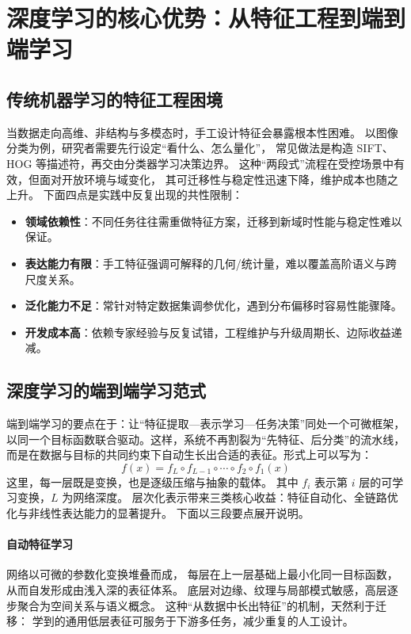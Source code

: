 \section{深度学习的核心优势：从特征工程到端到端学习}

\subsection{传统机器学习的特征工程困境}

当数据走向高维、非结构与多模态时，手工设计特征会暴露根本性困难。  
以图像分类为例，研究者需要先行设定“看什么、怎么量化”，  
常见做法是构造 SIFT、HOG 等描述符，再交由分类器学习决策边界。  
这种“两段式”流程在受控场景中有效，但面对开放环境与域变化，  
其可迁移性与稳定性迅速下降，维护成本也随之上升。  
下面四点是实践中反复出现的共性限制：

\begin{itemize}
\item {\bf 领域依赖性}：不同任务往往需重做特征方案，迁移到新域时性能与稳定性难以保证。
\item {\bf 表达能力有限}：手工特征强调可解释的几何/统计量，难以覆盖高阶语义与跨尺度关系。
\item {\bf 泛化能力不足}：常针对特定数据集调参优化，遇到分布偏移时容易性能骤降。
\item {\bf 开发成本高}：依赖专家经验与反复试错，工程维护与升级周期长、边际收益递减。
\end{itemize}

\subsection{深度学习的端到端学习范式}

端到端学习的要点在于：让“特征提取—表示学习—任务决策”同处一个可微框架，  
以同一个目标函数联合驱动。这样，系统不再割裂为“先特征、后分类”的流水线，  
而是在数据与目标的共同约束下自动生长出合适的表征。形式上可以写为：
\begin{equation}
f(x) = f_L \circ f_{L-1} \circ \cdots \circ f_2 \circ f_1(x)
\end{equation}
这里，每一层既是变换，也是逐级压缩与抽象的载体。
其中 $f_i$ 表示第 $i$ 层的可学习变换，$L$ 为网络深度。  
层次化表示带来三类核心收益：特征自动化、全链路优化与非线性表达能力的显著提升。  
下面以三段要点展开说明。

\paragraph{自动特征学习}
网络以可微的参数化变换堆叠而成，  
每层在上一层基础上最小化同一目标函数，从而自发形成由浅入深的表征体系。  
底层对边缘、纹理与局部模式敏感，高层逐步聚合为空间关系与语义概念。  
这种“从数据中长出特征”的机制，天然利于迁移：  
学到的通用低层表征可服务于下游多任务，减少重复的人工设计。

